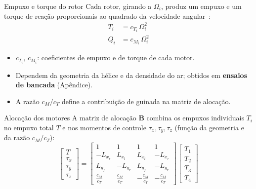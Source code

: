 \documentclass[aspectratio=169,11pt]{beamer}
\begin{document}
\begin{frame}{Empuxo e torque do rotor}
  Cada rotor, girando a $\Omega_i$, produz um empuxo e um torque de reação proporcionais ao quadrado da velocidade angular~\cite{Graesdal2021,Quan2017}:
  \begin{align*}
    T_i &= c_{T_i}\,\Omega_i^{2} \tag{2.8}\\[0.3em]
    Q_i &= c_{M_i}\,\Omega_i^{2} \tag{2.9}
  \end{align*}
  \vfill
  \begin{itemize}
    \item $c_{T_i},\,c_{M_i}$: coeficientes de empuxo e de torque de cada motor.
    \item Dependem da geometria da hélice e da densidade do ar; obtidos em \textbf{ensaios de bancada} (Apêndice).
    \item A razão $c_M/c_T$ define a contribuição de guinada na matriz de alocação.
  \end{itemize}
\end{frame}

\begin{frame}{Alocação dos motores}
  A matriz de alocação $\mathbf{B}$ combina os empuxos individuais $T_i$ no empuxo total $T$ e nos momentos de controle $\tau_x,\tau_y,\tau_z$ (função da geometria e da razão $c_M/c_T$):
  \vfill
  \begin{equation}
    \begin{bmatrix} T \\ \tau_x \\ \tau_y \\ \tau_z \end{bmatrix} =
    \begin{bmatrix}
      1 & 1 & 1 & 1 \\
      -L_{x_r} & L_{x_l} & L_{x_l} & -L_{x_r} \\
      L_{y_f} & -L_{y_r} & L_{y_f} & -L_{y_r} \\
      \tfrac{c_M}{c_T} & \tfrac{c_M}{c_T} & -\tfrac{c_M}{c_T} & -\tfrac{c_M}{c_T}
    \end{bmatrix}
    \begin{bmatrix} T_1 \\ T_2 \\ T_3 \\ T_4 \end{bmatrix}
    \tag{2.15}
  \end{equation}
\end{frame}
\end{document}
